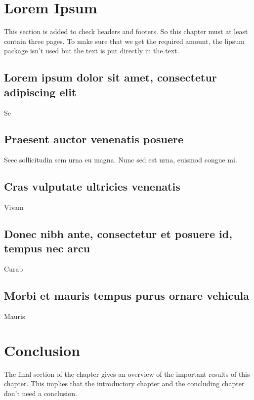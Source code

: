 \section{Lorem Ipsum}
This section is added to check headers and footers. So this chapter must at
least contain three pages. To make sure that we get the required amount,
the \textsf{lipsum} package isn't used but the text is put directly in the
text.

\subsection{Lorem ipsum dolor sit amet, consectetur adipiscing elit}
Se

\subsection{Praesent auctor venenatis posuere}
Seec sollicitudin sem urna eu magna. Nunc sed est urna, euismod congue
mi.

\subsection{Cras vulputate ultricies venenatis}
Vivam

\subsection{Donec nibh ante, consectetur et posuere id, tempus nec arcu}
Curab

\subsection{Morbi et mauris tempus purus ornare vehicula}
Mauris 

\section{Conclusion}
The final section of the chapter gives an overview of the important results
of this chapter. This implies that the introductory chapter and the
concluding chapter don't need a conclusion.



